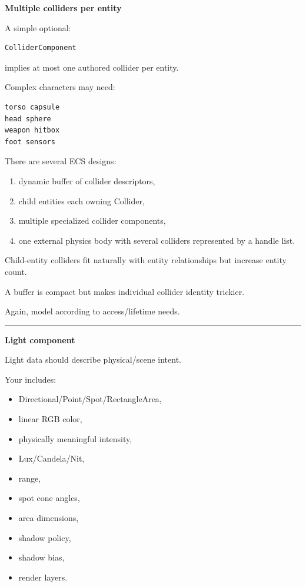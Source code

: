 \textbf{Multiple colliders per entity}

A simple optional:

\begin{verbatim}
ColliderComponent
\end{verbatim}

implies at most one authored collider per entity.

Complex characters may need:

\begin{verbatim}
torso capsule
head sphere
weapon hitbox
foot sensors
\end{verbatim}

There are several ECS designs:

\begin{enumerate}
\def\labelenumi{\arabic{enumi}.}
\tightlist
\item
  dynamic buffer of collider descriptors,
\item
  child entities each owning Collider,
\item
  multiple specialized collider components,
\item
  one external physics body with several colliders represented by a handle list.
\end{enumerate}

Child-entity colliders fit naturally with entity relationships but increase entity count.

A buffer is compact but makes individual collider identity trickier.

Again, model according to access/lifetime needs.

\begin{center}\rule{0.5\linewidth}{0.5pt}\end{center}

\textbf{Light component}

Light data should describe physical/scene intent.

Your  includes:

\begin{itemize}
\tightlist
\item
  Directional/Point/Spot/RectangleArea,
\item
  linear RGB color,
\item
  physically meaningful intensity,
\item
  Lux/Candela/Nit,
\item
  range,
\item
  spot cone angles,
\item
  area dimensions,
\item
  shadow policy,
\item
  shadow bias,
\item
  render layers.
\end{itemize}

